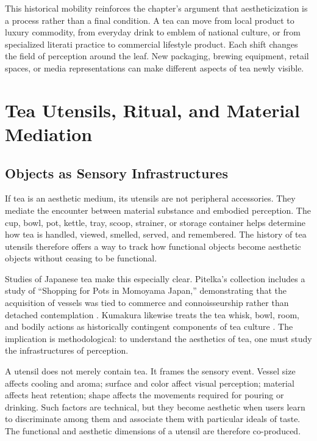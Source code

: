 \documentclass[numbers]{IntechOpen-Book}
\begin{document}
This historical mobility reinforces the chapter's argument that aestheticization is a process rather than a final condition. A tea can move from local product to luxury commodity, from everyday drink to emblem of national culture, or from specialized literati practice to commercial lifestyle product. Each shift changes the field of perception around the leaf. New packaging, brewing equipment, retail spaces, or media representations can make different aspects of tea newly visible.

\section{Tea Utensils, Ritual, and Material Mediation}

\subsection{Objects as Sensory Infrastructures}

If tea is an aesthetic medium, its utensils are not peripheral accessories. They mediate the encounter between material substance and embodied perception. The cup, bowl, pot, kettle, tray, scoop, strainer, or storage container helps determine how tea is handled, viewed, smelled, served, and remembered. The history of tea utensils therefore offers a way to track how functional objects become aesthetic objects without ceasing to be functional.

Studies of Japanese tea make this especially clear. Pitelka's collection includes a study of ``Shopping for Pots in Momoyama Japan,'' demonstrating that the acquisition of vessels was tied to commerce and connoisseurship rather than detached contemplation \cite{pitelka}. Kumakura likewise treats the tea whisk, bowl, room, and bodily actions as historically contingent components of tea culture \cite{kumakura}. The implication is methodological: to understand the aesthetics of tea, one must study the infrastructures of perception.

A utensil does not merely contain tea. It frames the sensory event. Vessel size affects cooling and aroma; surface and color affect visual perception; material affects heat retention; shape affects the movements required for pouring or drinking. Such factors are technical, but they become aesthetic when users learn to discriminate among them and associate them with particular ideals of taste. The functional and aesthetic dimensions of a utensil are therefore co-produced.
\end{document}
